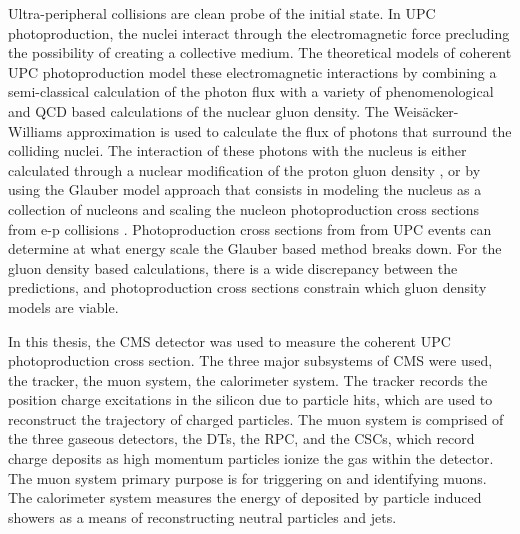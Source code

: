    Ultra-peripheral collisions are clean probe of the initial state. 
    In UPC \JPsi{} photoproduction, the nuclei interact through the 
      electromagnetic force precluding the possibility of creating a collective
      medium.
    The theoretical models of coherent UPC \JPsi{} photoproduction model these 
      electromagnetic interactions by combining a semi-classical calculation 
      of the photon flux with a variety of phenomenological and QCD based 
      calculations of the nuclear gluon density. 
    The Weis\"{a}cker-Williams approximation \cite{WWFermi} is used to calculate 
      the flux of photons that surround the colliding nuclei. 
    The interaction of these photons with the nucleus is either calculated 
      through a nuclear modification of the proton gluon density 
      \cite{pQCD2013.02, lta2012.03}, or by using the Glauber model approach 
      that consists in modeling the nucleus as a collection
      of nucleons and scaling the nucleon photoproduction cross sections from 
      e-p collisions \cite{vmd1999}. 
    Photoproduction cross sections from from UPC events can determine at what 
      energy scale the Glauber based method breaks down.
    For the gluon density based calculations, there is a wide discrepancy
      between the predictions, and photoproduction cross sections constrain which
      gluon density models are viable. 
  
    In this thesis, the CMS detector was used to measure the coherent UPC \JPsi{} 
      photoproduction cross section.
    The three major subsystems of CMS were used, the tracker, 
      the muon system, the calorimeter system.
    The tracker records the position charge excitations in the silicon due to 
      particle hits, which are used to reconstruct the trajectory of charged 
      particles. 
    The muon system is comprised of the three gaseous detectors, the DTs, the 
      RPC, and the CSCs, which record charge deposits as high momentum particles
      ionize the gas within the detector.
    The muon system primary purpose is for triggering on and identifying muons.
    The calorimeter system measures the energy of deposited by particle induced
      showers as a means of reconstructing neutral particles and jets.
    
